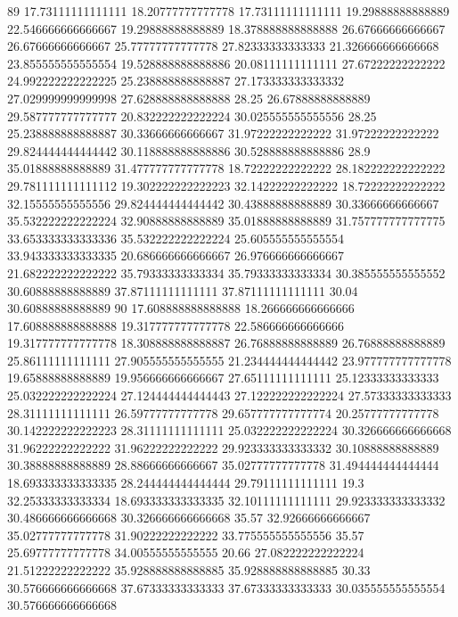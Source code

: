 89 17.73111111111111 18.20777777777778 17.73111111111111 19.29888888888889 22.546666666666667 19.29888888888889 18.378888888888888 26.67666666666667 26.67666666666667 25.77777777777778 27.82333333333333 21.326666666666668 23.855555555555554 19.528888888888886 20.08111111111111 27.67222222222222 24.992222222222225 25.238888888888887 27.173333333333332 27.029999999999998 27.628888888888888 28.25 26.67888888888889 29.587777777777777 20.832222222222224 30.025555555555556 28.25 25.238888888888887 30.33666666666667 31.97222222222222 31.97222222222222 29.824444444444442 30.118888888888886 30.528888888888886 28.9 35.01888888888889 31.477777777777778 18.72222222222222 28.182222222222222 29.781111111111112 19.302222222222223 32.14222222222222 18.72222222222222 32.15555555555556 29.824444444444442 30.43888888888889 30.33666666666667 35.532222222222224 32.90888888888889 35.01888888888889 31.757777777777775 33.653333333333336 35.532222222222224 25.605555555555554 33.943333333333335 20.686666666666667 26.976666666666667 21.682222222222222 35.79333333333334 35.79333333333334 30.385555555555552 30.60888888888889 37.87111111111111 37.87111111111111 30.04 30.60888888888889
90 17.608888888888888 18.266666666666666 17.608888888888888 19.317777777777778 22.586666666666666 19.317777777777778 18.308888888888887 26.76888888888889 26.76888888888889 25.86111111111111 27.905555555555555 21.234444444444442 23.977777777777778 19.65888888888889 19.956666666666667 27.65111111111111 25.12333333333333 25.032222222222224 27.124444444444443 27.122222222222224 27.57333333333333 28.31111111111111 26.59777777777778 29.657777777777774 20.25777777777778 30.142222222222223 28.31111111111111 25.032222222222224 30.326666666666668 31.96222222222222 31.96222222222222 29.923333333333332 30.10888888888889 30.38888888888889 28.88666666666667 35.02777777777778 31.494444444444444 18.693333333333335 28.244444444444444 29.79111111111111 19.3 32.25333333333334 18.693333333333335 32.10111111111111 29.923333333333332 30.486666666666668 30.326666666666668 35.57 32.92666666666667 35.02777777777778 31.90222222222222 33.775555555555556 35.57 25.69777777777778 34.00555555555555 20.66 27.082222222222224 21.51222222222222 35.928888888888885 35.928888888888885 30.33 30.576666666666668 37.67333333333333 37.67333333333333 30.035555555555554 30.576666666666668
